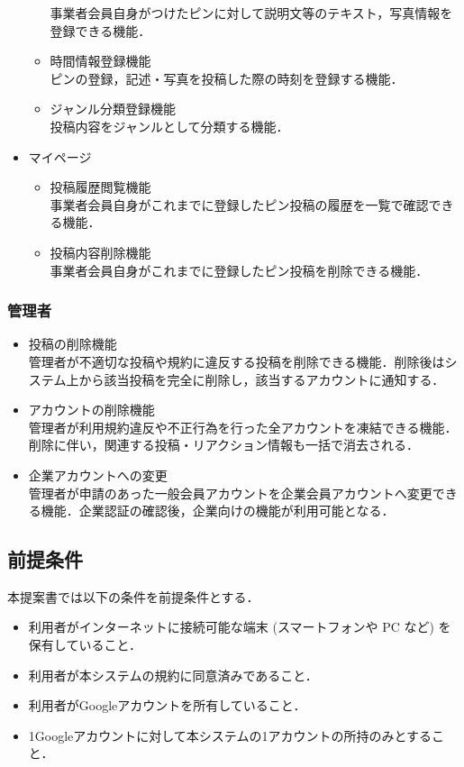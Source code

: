 \begin{itemize}[itemsep=10pt]
\begin{itemize}[itemsep=10pt]
        事業者会員自身がつけたピンに対して説明文等のテキスト，写真情報を登録できる機能．
        \item 時間情報登録機能 \mbox{}\\
        ピンの登録，記述・写真を投稿した際の時刻を登録する機能．
        \item ジャンル分類登録機能 \mbox{}\\
        投稿内容をジャンルとして分類する機能．
    \end{itemize}
    \item マイページ
    \begin{itemize}[itemsep=10pt]
        \item 投稿履歴閲覧機能 \mbox{}\\
        事業者会員自身がこれまでに登録したピン投稿の履歴を一覧で確認できる機能．
        \item 投稿内容削除機能 \mbox{}\\
        事業者会員自身がこれまでに登録したピン投稿を削除できる機能．
    \end{itemize}
\end{itemize}

\subsubsection{管理者}
\begin{itemize}[itemsep=10pt]
    \item 投稿の削除機能 \mbox{}\\
    管理者が不適切な投稿や規約に違反する投稿を削除できる機能．削除後はシステム上から該当投稿を完全に削除し，該当するアカウントに通知する．
    \item アカウントの削除機能 \mbox{}\\
    管理者が利用規約違反や不正行為を行った全アカウントを凍結できる機能．削除に伴い，関連する投稿・リアクション情報も一括で消去される．
    \item 企業アカウントへの変更 \mbox{}\\
    管理者が申請のあった一般会員アカウントを企業会員アカウントへ変更できる機能．企業認証の確認後，企業向けの機能が利用可能となる．
\end{itemize}

\subsection{前提条件}
本提案書では以下の条件を前提条件とする．
\begin{itemize}
    \item 利用者がインターネットに接続可能な端末 (スマートフォンや PC など) を保有していること．
    \item 利用者が本システムの規約に同意済みであること．
    \item 利用者がGoogleアカウントを所有していること．
    \item 1Googleアカウントに対して本システムの1アカウントの所持のみとすること．
\end{itemize}

